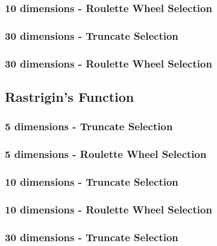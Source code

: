 \documentclass{article}
\begin{document}
\subsubsection{10 dimensions - Roulette Wheel Selection}


\subsubsection{30 dimensions - Truncate Selection}

\subsubsection{30 dimensions - Roulette Wheel Selection}

\newpage
\subsection{Rastrigin’s Function}

\subsubsection{5 dimensions - Truncate Selection}

\subsubsection{5 dimensions - Roulette Wheel Selection}

\subsubsection{10 dimensions - Truncate Selection}

\subsubsection{10 dimensions - Roulette Wheel Selection}

\subsubsection{30 dimensions - Truncate Selection}
\end{document}

